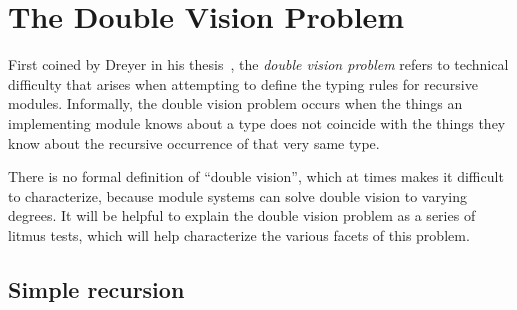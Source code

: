 
\iffalse%

\chapter{The Double Vision Problem}
\label{sec:double-vision}

First coined by Dreyer in his thesis~\cite{dreyer:thesis}, the
\emph{double vision problem} refers to technical difficulty that arises
when attempting to define the typing rules for recursive modules.
Informally, the double vision problem occurs when the things an implementing
module knows about a type does not coincide with the things they know about the
recursive occurrence of that very same type.

There is no formal definition of ``double vision'', which at times makes it
difficult to characterize, because module systems can solve double vision
to varying degrees.  It will be
helpful to explain the double vision problem as a series of litmus tests,
which will help characterize the various facets of this problem.

\section{Simple recursion}

